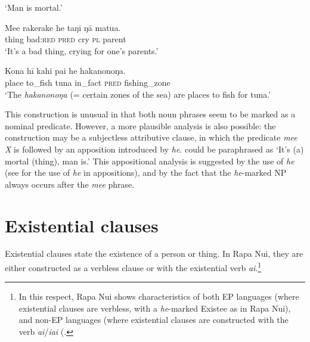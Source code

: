 \glt 
‘Man is mortal.’ \textstyleExampleref{[R210.073]} 
\z

\ea\label{ex:9.57}
\gll Me{\ꞌ}e rakerake he taŋi ŋā matu{\ꞌ}a. \\
thing bad:\textsc{red} \textsc{pred} cry \textsc{pl} parent \\

\glt 
‘It’s a bad thing, crying for one’s parents.’ \textstyleExampleref{[Ley-9-55.073]}
\z

\ea\label{ex:9.58}
\gll Kona hī kahi pa{\ꞌ}i he hakanonoŋa.\\
place to\_fish tuna in\_fact \textsc{pred} fishing\_zone\\

\glt
‘The \textit{hakanonoŋa} (= certain zones of the sea) are places to fish for tuna.’ \textstyleExampleref{[R200.030]} 
\z

This construction is unusual in that both noun phrases seem to be marked as a nominal predicate. However, a more plausible analysis is also possible: the construction may be a subjectless attributive clause, in which the predicate \textit{\mbox{me{\ꞌ}e} X} is followed by an apposition introduced by \textit{he}.  could be paraphrased as ‘It’s (a) mortal (thing), man is.’ This appositional analysis is suggested by the use of \textit{he} (see  for the use of \textit{he} in appositions), and by the fact that the \textit{he}{}-marked NP always occurs after the \textit{me{\ꞌ}e} phrase. 

\section{Existential clauses}\label{sec:9.3}
Existential clauses state the existence of a person or thing. In Rapa Nui, they are either constructed as a verbless clause or with the existential verb \textit{ai}.\footnote{\label{fn:472}In this respect, Rapa Nui shows characteristics of both EP languages (where existential clauses are verbless, with a \textit{he}{}-marked Existee as in Rapa Nui), and non-EP languages (where existential clauses are constructed with the verb \textit{ai}/\textit{iai} (\citealt[101]{Clark1976,Clark1997}.} 

